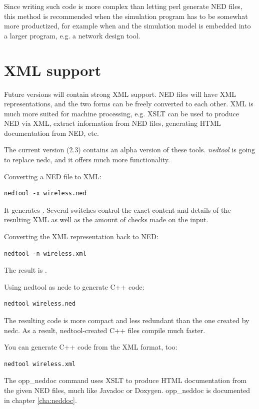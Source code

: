 Since writing such code is more complex than letting perl generate
NED files, this method is recommended when the simulation program
has to be somewhat more productized, for example when {\opp}
and the simulation model is embedded into a larger program, e.g.
a network design tool.


\section{XML support}

Future {\opp} versions will contain strong XML support.
NED files will have XML representations, and the two forms
can be freely converted to each other. XML is much more suited
for machine processing, e.g. XSLT can be used to
produce NED via XML, extract information from NED files,
generating HTML documentation from NED, etc.

The current version (2.3) contains an alpha version of
these tools. \textit{nedtool} is going to replace nedc,
and it offers much more functionality.

Converting a NED file to XML:

\begin{verbatim}
nedtool -x wireless.ned
\end{verbatim}

It generates .
Several switches control the exact content and details
of the resulting XML as well as the amount of checks
made on the input.

Converting the XML representation back to NED:

\begin{verbatim}
nedtool -n wireless.xml
\end{verbatim}

The result is .

Using nedtool as nedc to generate C++ code:

\begin{verbatim}
nedtool wireless.ned
\end{verbatim}

The resulting code is more compact and less redundant than the
one created by nedc. As a result, nedtool-created 
C++ files compile much faster.

You can generate C++ code from the XML format, too:

\begin{verbatim}
nedtool wireless.xml
\end{verbatim}

The opp\_neddoc command uses XSLT to produce HTML documentation
from the given NED files, much like Javadoc or Doxygen.
opp\_neddoc is documented in chapter \ref{cha:neddoc}.



